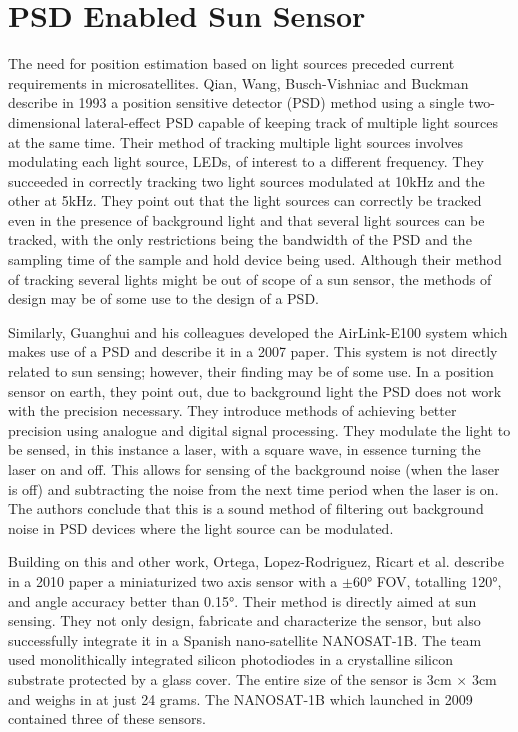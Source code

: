 \section{PSD Enabled Sun Sensor}
The need for position estimation based on light sources preceded current requirements in microsatellites. 
Qian, Wang, Busch-Vishniac and Buckman describe in 1993 a position sensitive detector (PSD) method using a single two-dimensional lateral-effect PSD capable of keeping track of multiple light sources at the same time. 
Their method of tracking multiple light sources involves modulating each light source, LEDs, of interest to a different frequency. 
They succeeded in correctly tracking two light sources modulated at 10kHz and the other at 5kHz. They point out that the light sources can correctly be tracked even in the presence of background light and that several light sources can be tracked, with the only restrictions being the bandwidth of the PSD and the sampling time of the sample and hold device being used. 
Although their method of tracking several lights might be out of scope of a sun sensor, the methods of design may be of some use to the design of a PSD.

Similarly, Guanghui and his colleagues developed the AirLink-E100 system which makes use of a PSD and describe it in a 2007 paper. 
This system is not directly related to sun sensing; however, their finding may be of some use. 
In a position sensor on earth, they point out, due to background light the PSD does not work with the precision necessary. 
They introduce methods of achieving better precision using analogue and digital signal processing. 
They modulate the light to be sensed, in this instance a laser, with a square wave, in essence turning the laser on and off. 
This allows for sensing of the background noise (when the laser is off) and subtracting the noise from the next time period when the laser is on. 
The authors conclude that this is a sound method of filtering out background noise in PSD devices where the light source can be modulated\cite{RefWorks:2007position}.

Building on this and other work, Ortega, Lopez-Rodriguez, Ricart et al. describe in a 2010 paper a miniaturized two axis sensor with a $\pm$60° FOV, totalling 120°, and angle accuracy better than 0.15°. 
Their method is directly aimed at sun sensing. 
They not only design, fabricate and characterize the sensor, but also successfully integrate it in a Spanish nano-satellite NANOSAT-1B. 
The team used monolithically integrated silicon photodiodes in a crystalline silicon substrate protected by a glass cover. 
The entire size of the sensor is 3cm $\times$ 3cm and weighs in at just 24 grams. 
The NANOSAT-1B which launched in 2009 contained three of these sensors\cite{RefWorks:ortega2010miniaturized}.

